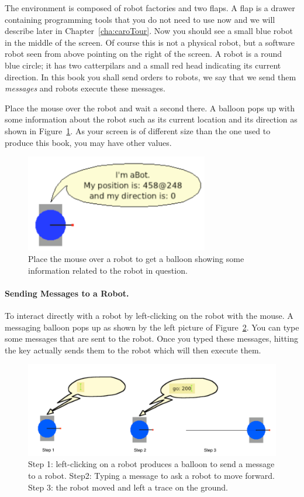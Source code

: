 The environment is composed of robot factories and two flaps. A flap is a drawer containing programming tools that you do not need to use now and we will describe later in Chapter~\ref{cha:caroTour}. Now you should see a small blue robot in the middle of the screen. Of course this is not a physical robot, but a software robot seen from above pointing on the right of the screen.  A robot is a round blue circle; it has two catterpilars and a small red head indicating its current direction. In this book you shall send orders to robots, we say that we send them \emph{messages}  and robots execute these messages.

Place the mouse over the robot and wait a second there. A balloon pops up with some information about the robot such as its current location and its direction as shown in Figure~\ref{fig:firstBalloon}. As your screen is of different size than the one used to produce this book, you may have other values.  

\begin{figure}[!h]\centerline{\includegraphics[width=8cm]{firstBalloon2}}
\caption{Place the mouse over a robot to get a balloon showing some information related to the robot in question.\label{fig:firstBalloon}}
\end{figure}

\paragraph{Sending Messages to a Robot.}
To interact directly with a robot by left-clicking on the robot with the mouse.  A messaging balloon pops up as shown by the left picture of Figure~\ref{fig:go}.  You can type some messages that are sent to the robot. Once you typed these messages, hitting the  key actually sends them to the robot which will then execute them.

\begin{figure}[h]\centerline{\includegraphics[width=16cm]{sendingAMsg2}}
\caption{Step 1: left-clicking on a robot produces a balloon to send a message to a robot. Step2: Typing a message to ask a robot to move forward. Step 3: the robot moved and left a trace on the ground.\label{fig:go}}
\end{figure}

